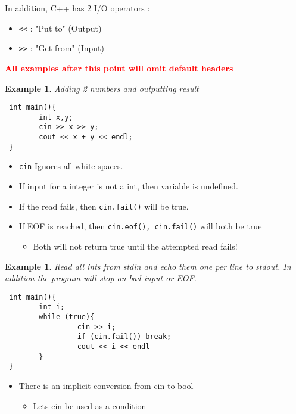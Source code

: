\documentclass{article}
\newtheorem{ex}[theorem]{Example}
\newenvironment{ablock}[1]{%
    \tcolorbox[beamer,%
    noparskip,breakable,
    colback=lightcoral,colframe=darkred,%
    colbacklower=tomato!75!lightcoral,%
    title=#1]}%
    {\endtcolorbox}
\begin{document}
 In addition, C++ has 2 I/O operators :
 \begin{itemize}
 \item \verb|<<| : "Put to"  (Output)
 \item \verb|>>| : "Get from" (Input)
 \end{itemize}

\begin{center}
\textbf{\textcolor{red}{All examples after this point will omit default headers}}
\end{center} 
 
 \begin{ex}
 Adding 2 numbers and outputting result
 \begin{lstlisting}
 int main(){
 		int x,y;
 		cin >> x >> y;
 		cout << x + y << endl;
 }
 \end{lstlisting}
 \end{ex}
 
 \begin{ablock}{Notes on cin}
\begin{itemize}
\item \verb|cin| Ignores all white spaces. 
\item If input for a integer is not a int, then variable is undefined.
\item If the read fails, then \verb|cin.fail()| will be true.
\item If EOF is reached, then \verb|cin.eof(), cin.fail()| will both be true
\begin{itemize}
\item Both will not return true until the attempted read fails!
\end{itemize}
\end{itemize}
 \end{ablock}
 
 \begin{ex}
 Read all ints from stdin and echo them one per line to stdout. In addition the program will stop on bad input or EOF.
 \begin{lstlisting}
 int main(){
 		int i;
 		while (true){
 				 cin >> i; 
				 if (cin.fail()) break; 
				 cout << i << endl
 		}
 }
 \end{lstlisting}
 \end{ex}

\begin{ablock}{Note}
\begin{itemize}
\item There is an implicit conversion from cin to bool 
\begin{itemize}
\item Lets cin be used as a condition 
\end{itemize}
\end{itemize}
\end{ablock}
\end{document}

